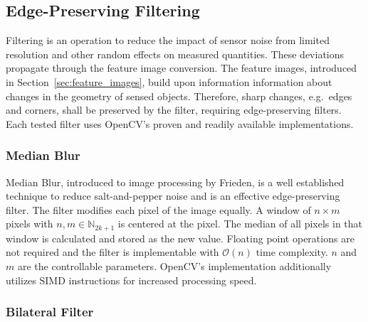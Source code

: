 \subsection{Edge-Preserving Filtering}

Filtering is an operation to reduce the impact of sensor noise from limited resolution and other random effects on measured quantities.
These deviations propagate through the feature image conversion.
The feature images, introduced in Section~\ref{sec:feature_images}, build upon information information about changes in the geometry of sensed objects.
Therefore, sharp changes, e.g.~edges and corners, shall be preserved by the filter, requiring edge-preserving filters.
Each tested filter uses OpenCV's\cite{opencv_library} proven and readily available implementations.

\subsubsection{Median Blur}

Median Blur, introduced to image processing by Frieden\cite{frieden_new76}, is a well established technique to reduce salt-and-pepper noise and is an effective edge-preserving filter.
The filter modifies each pixel of the image equally.
A window of $n \times m$ pixels with $n,m \in \mathbb{N}_{2k + 1}$ is centered at the pixel.
The median of all pixels in that window is calculated and stored as the new value.
Floating point operations are not required and the filter is implementable with $\mathcal{O}(n)$\cite{huang_ieee79} time complexity.
$n$ and $m$ are the controllable parameters.
OpenCV's\cite{opencv_library} implementation additionally utilizes \acrshort{SIMD} instructions for increased processing speed.

\subsubsection{Bilateral Filter}


